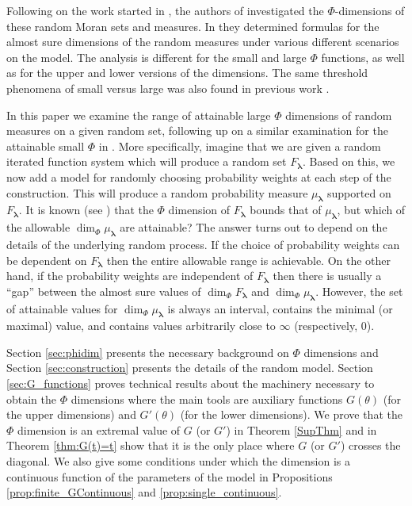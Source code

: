 \documentclass{amsart}
\theoremstyle{plain}
\numberwithin{equation}{section}
\newcommand{\blambda}{{\boldsymbol{\lambda}}}
\begin{document}
Following on the work started in \cite{FMT, Tr0, Tr}, the authors of \cite{HM, HM2, HM3} investigated the $\Phi$-dimensions of these random Moran sets and measures.
In \cite{HM, HM2} they determined formulas for the almost sure dimensions of the random measures under various different scenarios on the model.
The analysis is different for the small and large $\Phi$ functions, as well as for the upper and lower versions of the dimensions.
The same threshold phenomena of small versus large was also found in previous work \cite{GHM,Tr2}.

In this paper we examine the range of attainable large $\Phi$ dimensions of random measures on a given random set, following up on a similar examination for the attainable small $\Phi$ in \cite{HM3}.
More specifically, imagine that we are given a random iterated function system which will produce a random set $F_\blambda$.
Based on this, we now add a model for randomly choosing probability weights at each step of the construction.
This will produce a random probability measure $\mu_\blambda$ supported on $F_\blambda$.
It is known (see \cite{HH}) that the $\Phi$ dimension of $F_\blambda$ bounds that of $\mu_\blambda$, but which of the allowable
$\dim_\Phi \mu_\blambda$ are attainable?
The answer turns out to depend on the details of the underlying random process.
If the choice of probability weights can be dependent on $F_\blambda$ then the entire allowable range is achievable.
On the other hand, if the probability weights are independent of $F_\blambda$ then there is usually a ``gap'' between 
the almost sure values of $\dim_\Phi F_\blambda$ and $\dim_\Phi \mu_\blambda$.
However, the set of attainable values for $\dim_\Phi \mu_\blambda$ is always an interval, contains the minimal (or maximal) value, and
contains values arbitrarily close to $\infty$ (respectively, $0$).


Section \ref{sec:phidim} presents the necessary background on $\Phi$ dimensions and
Section \ref{sec:construction} presents the details of the random model.
Section \ref{sec:G_functions} proves technical results about the machinery necessary to obtain the $\Phi$ dimensions where the main tools
are auxiliary functions $G(\theta)$ (for the upper dimensions) and $G'(\theta)$ (for the lower dimensions).
We prove that the $\Phi$ dimension is an extremal value of $G$ (or $G'$) in Theorem \ref{SupThm} and 
in Theorem \ref{thm:G(t)=t} show that it is the only place where $G$ (or $G'$) crosses the diagonal.
We also give some conditions under which the dimension is a continuous
function of the parameters of the model in Propositions \ref{prop:finite_GContinuous} and \ref{prop:single_continuous}.
\end{document}
